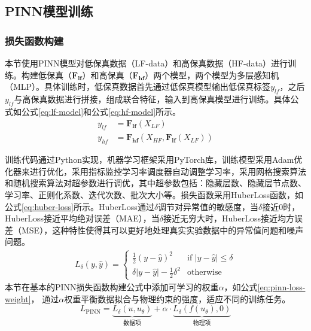 \subsection{PINN模型训练}
\subsubsection{损失函数构建}
本节使用PINN模型对低保真数据（LF-data）和高保真数据（HF-data）进行训练。构建低保真（$\mathbf{F_{lf}}$）和高保真（$\mathbf{F_{hf}}$）两个模型，两个模型为多层感知机（MLP）。具体训练时，低保真数据首先通过低保真模型输出低保真标签$y_{lf}$，之后$y_{lf}$与高保真数据进行拼接，组成联合特征，输入到高保真模型进行训练。具体公式如公式\eqref{eq:lf-model}和公式\eqref{eq:hf-model}所示。
\begin{align}
  y_{lf} & = \mathbf{F_{lf}}(X_{LF}) \label{eq:lf-model}                          \\
  y_{hf} & = \mathbf{F_{hf}}(X_{HF}, \mathbf{F_{lf}}(X_{LF})) \label{eq:hf-model}
\end{align}

训练代码通过Python实现，机器学习框架采用PyTorch库，训练模型采用Adam优化器来进行优化，采用指标监控学习率调度器自动调整学习率，采用网格搜索算法和随机搜索算法对超参数进行调优，其中超参数包括：隐藏层数、隐藏层节点数、学习率、正则化系数、迭代次数、批次大小等。损失函数采用HuberLoss函数，如公式\eqref{eq:huber-loss}所示。HuberLoss通过$\delta$调节对异常值的敏感度，当$\delta$接近0时，HuberLoss接近平均绝对误差（MAE），当$\delta$接近无穷大时，HuberLoss接近均方误差（MSE），这种特性使得其可以更好地处理真实实验数据中的异常值问题和噪声问题。
\begin{equation}
  \begin{aligned}
    L_\delta(y, \hat{y}) =
    \begin{cases}
      \frac{1}{2}(y - \hat{y})^2                 & \text{if } |y - \hat{y}| \le \delta    \\
      \delta |y - \hat{y}| - \frac{1}{2}\delta^2 & \text{otherwise} \label{eq:huber-loss}
    \end{cases}
  \end{aligned}
\end{equation}
本节在基本的PINN损失函数构建公式中添加可学习的权重$\alpha$，如公式\eqref{eq:pinn-loss-weight}， 通过$\alpha$权重平衡数据拟合与物理约束的强度，适应不同的训练任务。
\begin{equation}
  L_{\text{PINN}} = \underbrace{L_\delta(u, u_\theta)}_{\text{数据项}} + \alpha \cdot \underbrace{L_\delta(f(u_\theta), 0)}_{\text{物理项}} \label{eq:pinn-loss-weight}
\end{equation}

